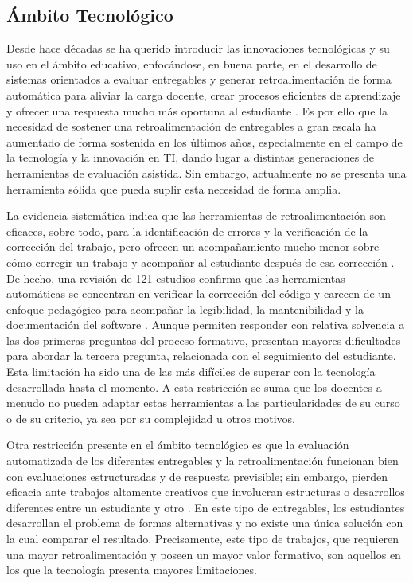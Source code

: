 \documentclass[letterpaper, 10 pt, conference]{ieeeconf}
\begin{document}
\subsection{Ámbito Tecnológico}  

Desde hace décadas se ha querido introducir las innovaciones tecnológicas y su uso en el ámbito educativo, enfocándose, en buena parte, en el desarrollo de sistemas orientados a evaluar entregables y generar retroalimentación de forma automática para aliviar la carga docente, crear procesos eficientes de aprendizaje y ofrecer una respuesta mucho más oportuna al estudiante \cite{9}. Es por ello que la necesidad de sostener una retroalimentación de entregables a gran escala ha aumentado de forma sostenida en los últimos años, especialmente en el campo de la tecnología y la innovación en TI, dando lugar a distintas generaciones de herramientas de evaluación asistida. Sin embargo, actualmente no se presenta una herramienta sólida que pueda suplir esta necesidad de forma amplia. 

La evidencia sistemática indica que las herramientas de retroalimentación son eficaces, sobre todo, para la identificación de errores y la verificación de la corrección del trabajo, pero ofrecen un acompañamiento mucho menor sobre cómo corregir un trabajo y acompañar al estudiante después de esa corrección \cite{10}. De hecho, una revisión de 121 estudios confirma que las herramientas automáticas se concentran en verificar la corrección del código y carecen de un enfoque pedagógico para acompañar la legibilidad, la mantenibilidad y la documentación del software \cite{11}. Aunque permiten responder con relativa solvencia a las dos primeras preguntas del proceso formativo, presentan mayores dificultades para abordar la tercera pregunta, relacionada con el seguimiento del estudiante. Esta limitación ha sido una de las más difíciles de superar con la tecnología desarrollada hasta el momento. A esta restricción se suma que los docentes a menudo no pueden adaptar estas herramientas a las particularidades de su curso o de su criterio, ya sea por su complejidad u otros motivos. 

Otra restricción presente en el ámbito tecnológico es que la evaluación automatizada de los diferentes entregables y la retroalimentación funcionan bien con evaluaciones estructuradas y de respuesta previsible; sin embargo, pierden eficacia ante trabajos altamente creativos que involucran estructuras o desarrollos diferentes entre un estudiante y otro \cite{11}. En este tipo de entregables, los estudiantes desarrollan el problema de formas alternativas y no existe una única solución con la cual comparar el resultado. Precisamente, este tipo de trabajos, que requieren una mayor retroalimentación y poseen un mayor valor formativo, son aquellos en los que la tecnología presenta mayores limitaciones. 
\end{document}

